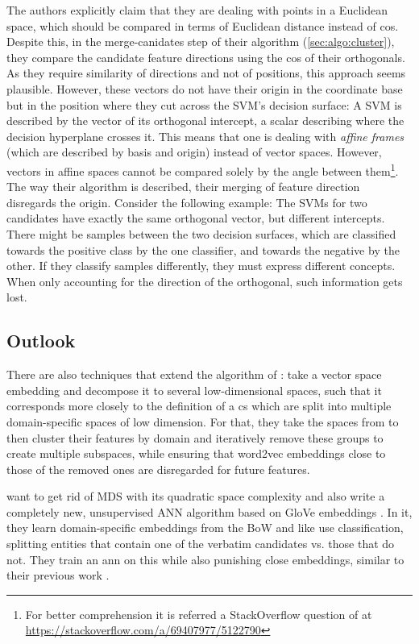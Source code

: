 The authors explicitly claim that they are dealing with points in a Euclidean space, which should be compared in terms of Euclidean distance \cite[14]{Derrac2015} instead of \gls{cos}. Despite this, in the merge-canidates step of their algorithm (\autoref{sec:algo:cluster}), they compare the candidate feature directions using the \gls{cos} of their orthogonals. As they require similarity of directions and not of positions, this approach seems plausible. However, these vectors do not have their origin in the coordinate base but in the position where they cut across the SVM's decision surface: A SVM is described by the vector of its orthogonal intercept, a scalar describing where the decision hyperplane crosses it. This means that one is dealing with \textit{affine frames} (which are described by basis and origin) instead of vector spaces. However, vectors in affine spaces cannot be compared solely by the angle between them\footnote{For better comprehension it is referred a StackOverflow question of \me at \url{https://stackoverflow.com/a/69407977/5122790}}. The way their algorithm is described, their merging of feature direction disregards the origin. Consider the following example: The SVMs for two candidates have exactly the same orthogonal vector, but different intercepts. There might be samples between the two decision surfaces, which are classified towards the positive class by the one classifier, and towards the negative by the other. If they classify samples differently, they must express different concepts. When only accounting for the direction of the orthogonal, such information gets lost. 

\subsection{Outlook}

There are also techniques that extend the algorithm of \textcite{Derrac2015}: \textcite{Alshaikh2019} take a vector space embedding and decompose it to several low-dimensional spaces, such that it corresponds more closely to the definition of a \gls{cs} which are split into multiple domain-specific spaces of low dimension. For that, they take the spaces from \cite{Derrac2015} to then cluster their features by domain and iteratively remove these groups to create multiple subspaces, while ensuring that \gls{word2vec} embeddings close to those of the removed ones are disregarded for future features.

\textcite{Alshaikh2021} want to get rid of MDS with its quadratic space complexity and also write a completely new, unsupervised ANN algorithm based on GloVe embeddings \cite{pennington2014glove}. In it, they learn domain-specific embeddings from the BoW and like \cite{Derrac2015} use classification, splitting entities that contain one of the verbatim candidates vs. those that do not. They train an \gls{ann} on this while also punishing close embeddings, similar to their previous work \cite{Alshaikh2019}.

